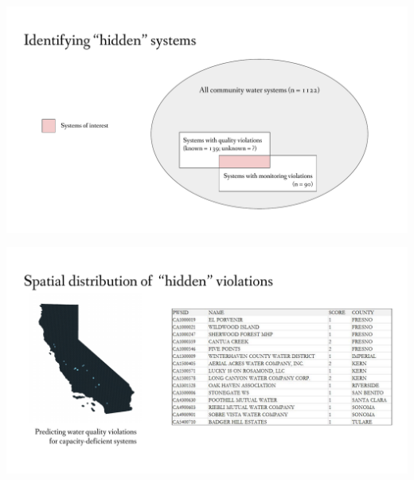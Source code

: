\documentclass[aspectratio=169]{beamer}
\begin{document}
\begin{frame}
\includegraphics[width=1.1\textwidth]{seigi_8}
\end{frame}

\begin{frame}
\includegraphics[width=1.1\textwidth]{seigi_9}
\end{frame}
\end{document}
